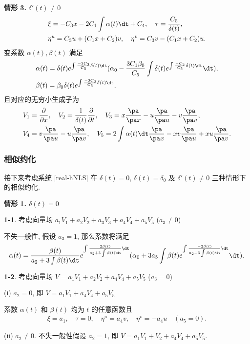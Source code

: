 \noindent \textbf{情形 3.} $\delta'(t)\neq 0$
\begin{align*}
&\xi=-C_3 x-2C_1\int\alpha(t)\dt+C_4,\quad \tau=\frac{C_5}{\delta(t)},\\
&\eta^u=C_3 u+(C_1x+C_2)v,\quad \eta^v=C_3 v-(C_1x+C_2)u.
\end{align*}
变系数 $\alpha(t), \beta(t)$ 满足
\begin{align*}
&\alpha(t)=\delta(t)e^{\int\frac{-2C_3}{C_5}\delta(t)\dt} (\alpha_0-\frac{3C_1\beta_0}{C_5}\int\delta(t)e^{\int\frac{-C_3}{C_5}\delta(t)\dt}\dt),\notag\\ &\beta(t)=\beta_0\delta(t)e^{\int\frac{-3C_3}{C_5}\delta(t)\dt},
\end{align*}
且对应的无穷小生成子为
\begin{align*}
&V_1=\frac{\partial}{\partial x},\quad V_2=\frac{1}{\delta(t)}\frac{\partial}{\partial t},\quad
V_3=x\frac{\pa}{\pa x}-u\frac{\pa}{\pa u}-v\frac{\pa}{\pa v},\\
&V_4=v\frac{\pa}{\pa u}-u\frac{\pa}{\pa v},\quad
V_5=2\int \alpha(t)\dt\frac{\pa}{\pa x}-xv\frac{\pa}{\pa u}+xu\frac{\pa}{\pa v}.
\end{align*}
\subsubsection{相似约化}
接下来考虑系统 \eqref{real-hNLS} 在 $\delta(t)=0$, $\delta(t)=\delta_0$ 及 $\delta'(t)\neq 0$ 三种情形下的相似约化.


\noindent \textbf{情形 1. $\delta(t)=0$}

\textbf{1-1}. 考虑向量场 $a_1 V_1+a_2 V_2+a_3 V_3+a_4 V_4+a_5 V_5$ ($a_3\neq 0$)

不失一般性, 假设 $a_3=1$, 那么系数将满足
\begin{equation}
\alpha(t)=\frac{\beta(t)}{a_2+3\int\beta(t)\dt} e^{\int\frac{2\beta(t)}{a_2+3\int\beta(t)\dt}\dt} (\alpha_0+3a_5\int\beta(t)e^{\int\frac{-2\beta(t)}{a_2+3\int\beta(t)\dt}\dt}\dt).
\end{equation}

\textbf{1-2}. 考虑向量场 $V=a_1 V_1+a_2 V_2+a_4 V_4+a_5 V_5$ ($a_3=0$)

(i) $a_2=0$, 即 $V=a_1 V_1+a_4 V_4+a_5 V_5$

系数 $\alpha(t)$ 和 $\beta(t)$ 均为 $t$ 的任意函数且
\begin{align}
\xi=a_1,\quad \tau=0,\quad \eta^u=a_4v,\quad \eta^v=-a_4u \quad(a_5=0).
\end{align}

(ii) $a_2\neq0$. 不失一般性假设 $a_2=1$, 即 $V=a_1 V_1+V_2+a_4 V_4+a_5V_5$.

